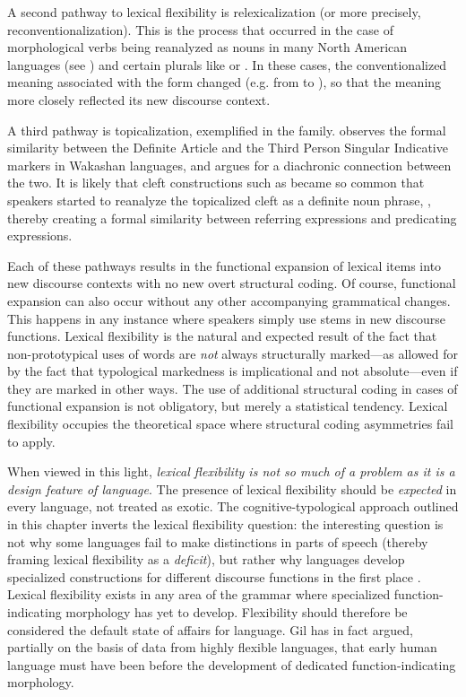 A second pathway to lexical flexibility is relexicalization (or more precisely, reconventionalization). This is the process that occurred in the case of morphological verbs being reanalyzed as nouns in many North American languages (see ) and certain  plurals like  or . In these cases, the conventionalized meaning associated with the form changed (e.g. from   to ), so that the meaning more closely reflected its new discourse context.

A third pathway is topicalization, exemplified in the  family. \textcite[122, 142]{Jacobsen1979} observes the formal similarity between the Definite Article and the Third Person Singular Indicative markers in Wakashan languages, and argues for a diachronic connection between the two. It is likely that cleft constructions such as  became so common that speakers started to reanalyze the topicalized cleft as a definite noun phrase, , thereby creating a formal similarity between referring expressions and predicating expressions.

Each of these pathways results in the functional expansion of lexical items into new discourse contexts with no new overt structural coding. Of course, functional expansion can also occur without any other accompanying grammatical changes. This happens in any instance where speakers simply use stems in new discourse functions. Lexical flexibility is the natural and expected result of the fact that non-prototypical uses of words are \emph{not} always structurally marked—as allowed for by the fact that typological markedness is implicational and not absolute—even if they are marked in other ways. The use of additional structural coding in cases of functional expansion is not obligatory, but merely a statistical tendency. Lexical flexibility occupies the theoretical space where structural coding asymmetries fail to apply.

When viewed in this light, \emph{lexical flexibility is not so much of a problem as it is a design feature of language}. The presence of lexical flexibility should be \emph{expected} in every language, not treated as exotic. The cognitive-typological approach outlined in this chapter inverts the lexical flexibility question: the interesting question is not why some languages fail to make distinctions in parts of speech (thereby framing lexical flexibility as a \emph{deficit}), but rather why languages develop specialized constructions for different discourse functions in the first place . Lexical flexibility exists in any area of the grammar where specialized function-indicating morphology has yet to develop. Flexibility should therefore be considered the default state of affairs for language. Gil \parencites*{Gil2005}{Gil2006} has in fact argued, partially on the basis of data from highly flexible languages, that early human language must have been  before the development of dedicated function-indicating morphology.

